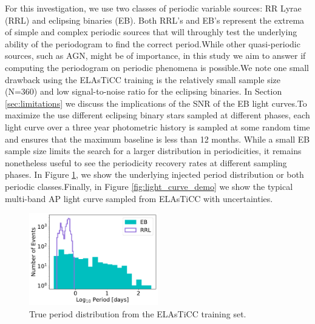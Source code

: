 \documentclass[DM,authoryear,toc]{lsstdoc}
\begin{document}
	
For this investigation, we use two classes of periodic variable sources: RR Lyrae (RRL) and eclipsing binaries (EB).
Both RRL's and EB's represent the extrema of simple and complex periodic sources that will throughly test the underlying ability of the periodogram to find the correct period.While other quasi-periodic sources, such as AGN, might be of importance, in this study we aim to answer if computing the periodogram on periodic phenomena is possible.We note one small drawback using the ELAsTiCC training is the relatively small sample size (N=360) and low signal-to-noise ratio for the eclipsing binaries. In Section \ref{sec:limitations} we discuss the implications of the SNR of the EB light curves.To maximize the use different eclipsing binary stars sampled at different phases, each light curve over a three year photometric history is sampled at some random time and ensures that the maximum baseline is less than 12 months.
While a small EB sample size limits the search for a larger distribution in periodicities, it remains nonetheless useful to see the periodicity recovery rates at different sampling phases. In Figure \ref{fig:period_distributions}, we show the underlying injected period distribution or both periodic classes.Finally, in Figure \ref{fig:light_curve_demo} we show the typical multi-band AP light curve sampled from ELAsTiCC with uncertainties.

\begin{figure}
  \includegraphics[width=0.5\textwidth]{figures/period_distribution.pdf}
  \centering 
  \caption{True period distribution from the ELAsTiCC training set.}
   \label{fig:period_distributions}
\end{figure}
\end{document}
